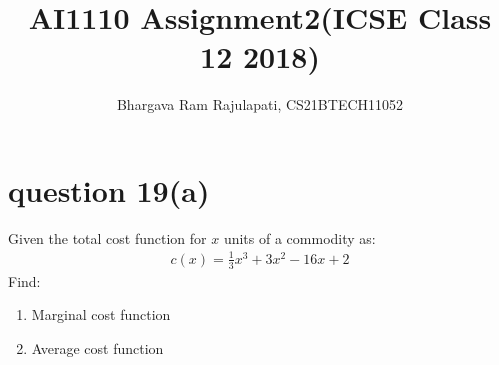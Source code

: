 \documentclass[article,12pt,twocolumn]{IEEEtran}
\title{AI1110 Assignment2(ICSE Class 12 2018)}
\author{Bhargava Ram Rajulapati, CS21BTECH11052}
\begin{document}
 \maketitle
 
 \section*{question 19(a)} 
   Given the total cost function for $x$ units of a commodity as:
   \begin{align*}
      c(x) = \frac{1}{3}x^3 + 3x^2 - 16x +2
   \end{align*}
   Find:
   \begin{enumerate}[ label=(\roman*)]
    \item Marginal cost function
    \item Average cost function
   \end{enumerate}
   
\end{document}
